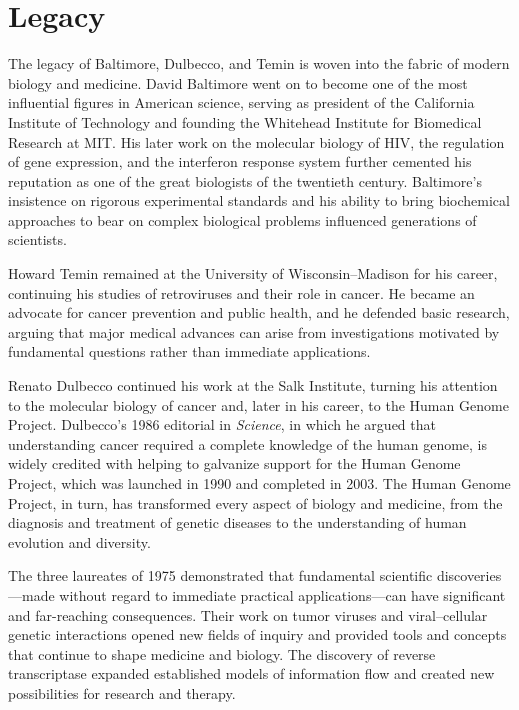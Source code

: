 \section{Legacy}

The legacy of Baltimore, Dulbecco, and Temin is woven into the fabric of modern biology and medicine. David Baltimore went on to become one of the most influential figures in American science, serving as president of the California Institute of Technology and founding the Whitehead Institute for Biomedical Research at MIT. His later work on the molecular biology of HIV, the regulation of gene expression, and the interferon response system further cemented his reputation as one of the great biologists of the twentieth century. Baltimore's insistence on rigorous experimental standards and his ability to bring biochemical approaches to bear on complex biological problems influenced generations of scientists.

Howard Temin remained at the University of Wisconsin--Madison for his career, continuing his studies of retroviruses and their role in cancer. He became an advocate for cancer prevention and public health, and he defended basic research, arguing that major medical advances can arise from investigations motivated by fundamental questions rather than immediate applications.

Renato Dulbecco continued his work at the Salk Institute, turning his attention to the molecular biology of cancer and, later in his career, to the Human Genome Project. Dulbecco's 1986 editorial in \emph{Science}, in which he argued that understanding cancer required a complete knowledge of the human genome, is widely credited with helping to galvanize support for the Human Genome Project, which was launched in 1990 and completed in 2003. The Human Genome Project, in turn, has transformed every aspect of biology and medicine, from the diagnosis and treatment of genetic diseases to the understanding of human evolution and diversity.

The three laureates of 1975 demonstrated that fundamental scientific discoveries---made without regard to immediate practical applications---can have significant and far-reaching consequences. Their work on tumor viruses and viral--cellular genetic interactions opened new fields of inquiry and provided tools and concepts that continue to shape medicine and biology. The discovery of reverse transcriptase expanded established models of information flow and created new possibilities for research and therapy.


